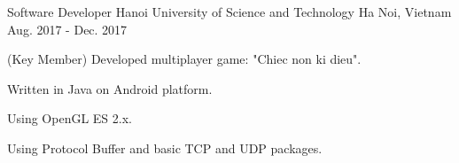 \begin{cventries}
\cventry
{Software Developer} %
{Hanoi University of Science and Technology} %
{Ha Noi, Vietnam} %
{Aug. 2017 - Dec. 2017} %
{ %
\begin{cvitems}
\item{(Key Member) Developed multiplayer game: "Chiec non ki dieu".}
\item{Written in Java on Android platform.}
\item{Using OpenGL ES 2.x.}
\item{Using Protocol Buffer and basic TCP and UDP packages.}
\end{cvitems}
}


\end{cventries}
